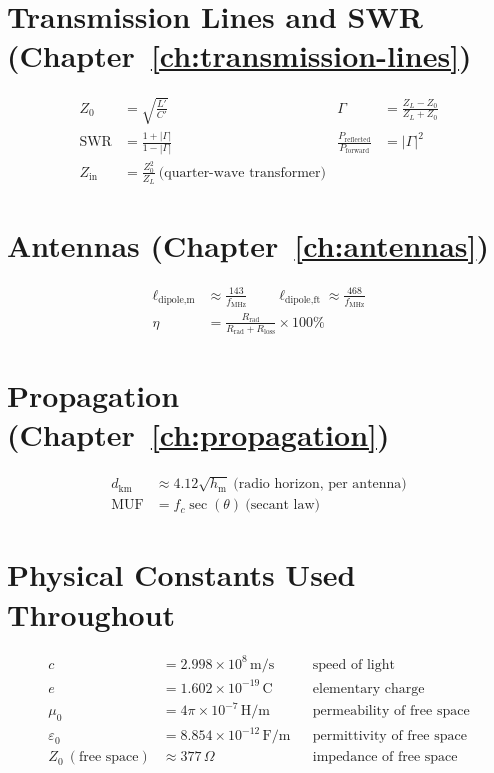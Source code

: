 \section*{Transmission Lines and SWR (Chapter~\ref{ch:transmission-lines})}
\begin{align*}
Z_0 &= \sqrt{\frac{L'}{C'}} & \Gamma &= \frac{Z_L-Z_0}{Z_L+Z_0} \\
\text{SWR} &= \frac{1+|\Gamma|}{1-|\Gamma|} & \frac{P_{\text{reflected}}}{P_{\text{forward}}} &= |\Gamma|^2 \\
Z_{\text{in}} &= \frac{Z_0^2}{Z_L}\ \text{(quarter-wave transformer)}
\end{align*}

\section*{Antennas (Chapter~\ref{ch:antennas})}
\begin{align*}
\ell_{\text{dipole,m}} &\approx \frac{143}{f_{\text{MHz}}} \qquad \ell_{\text{dipole,ft}} \approx \frac{468}{f_{\text{MHz}}} \\
\eta &= \frac{R_{\text{rad}}}{R_{\text{rad}}+R_{\text{loss}}}\times100\%
\end{align*}

\section*{Propagation (Chapter~\ref{ch:propagation})}
\begin{align*}
d_{\text{km}} &\approx 4.12\sqrt{h_{\text{m}}}\ \text{(radio horizon, per antenna)} \\
\text{MUF} &= f_c\sec(\theta)\ \text{(secant law)}
\end{align*}

\section*{Physical Constants Used Throughout}
\begin{align*}
c &= 2.998\times10^{8}\,\text{m/s} &&\text{speed of light} \\
e &= 1.602\times10^{-19}\,\text{C} &&\text{elementary charge} \\
\mu_0 &= 4\pi\times10^{-7}\,\text{H/m} &&\text{permeability of free space} \\
\varepsilon_0 &= 8.854\times10^{-12}\,\text{F/m} &&\text{permittivity of free space} \\
Z_0\ (\text{free space}) &\approx 377\,\Omega &&\text{impedance of free space}
\end{align*}
